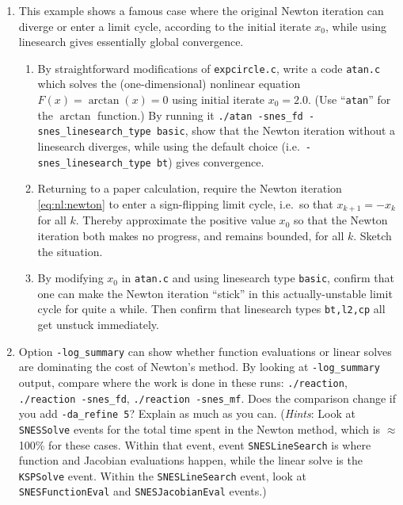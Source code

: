 \begin{enumerate}
\item  \label{exer:nl:newtonatan}
This example shows a famous case where the original Newton iteration can diverge or enter a limit cycle, according to the initial iterate $x_0$, while using linesearch gives essentially global convergence.
    \begin{enumerate}
    \item By straightforward modifications of \texttt{expcircle.c}, write a code \texttt{atan.c} which solves the (one-dimensional) nonlinear equation $F(x)=\arctan(x)=0$ using initial iterate $x_0=2.0$.  (Use ``\texttt{atan}'' for the $\arctan$ function.)  By running it \texttt{./atan -snes\_fd -snes\_linesearch\_type basic}, show that the Newton iteration without a linesearch diverges, while using the default choice (i.e.~\texttt{-snes\_linesearch\_type bt}) gives convergence.
    \item Returning to a paper calculation, require the Newton iteration \eqref{eq:nl:newton} to enter a sign-flipping limit cycle, i.e.~so that $x_{k+1} = - x_k$ for all $k$.  Thereby approximate the positive value $x_0$ so that the Newton iteration both makes no progress, and remains bounded, for all $k$.  Sketch the situation.
    \item By modifying $x_0$ in \texttt{atan.c} and using linesearch type \texttt{basic}, confirm that one can make the Newton iteration ``stick'' in this actually-unstable limit cycle for quite a while.  Then confirm that linesearch types \texttt{bt,l2,cp} all get unstuck immediately.
    \end{enumerate}

\item Option \texttt{-log\_summary} can show whether function evaluations or linear solves are dominating the cost of Newton's method.  By looking at \texttt{-log\_summary} output, compare where the work is done in these runs: \texttt{./reaction}, \texttt{./reaction -snes\_fd}, \texttt{./reaction -snes\_mf}.  Does the comparison change if you add \texttt{-da\_refine 5}?  Explain as much as you can.  (\emph{Hints}: Look at \texttt{SNESSolve} events for the total time spent in the Newton method, which is $\approx$100\% for these cases.  Within that event, event \texttt{SNESLineSearch} is where function and Jacobian evaluations happen, while the linear solve is the \texttt{KSPSolve} event.  Within the \texttt{SNESLineSearch} event, look at \texttt{SNESFunctionEval} and \texttt{SNESJacobianEval} events.)


\end{enumerate}
